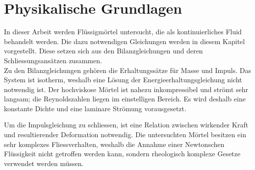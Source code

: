 \section{Physikalische Grundlagen}
\label{Kapitel:Rheologie}
In dieser Arbeit werden Flüssigmörtel untersucht, die als kontinuierliches Fluid behandelt werden.
Die dazu notwendigen Gleichungen werden in diesem Kapitel vorgestellt. Diese setzen sich aus den Bilanzgleichungen und deren Schliessungsansätzen zusammen.\\
Zu den Bilanzgleichungen gehören die Erhaltungssätze für Masse und Impuls. Das System ist isotherm, weshalb eine Lösung der Energieerhaltungsgleichung nicht notwendig ist.
Der hochviskose Mörtel ist nahezu inkompressibel und strömt sehr langsam; die Reynoldszahlen liegen im einstelligen Bereich. Es wird deshalb eine konstante Dichte und eine laminare Strömung vorausgesetzt.

Um die Impulsgleichung zu schliessen, ist eine Relation zwischen wirkender Kraft und resultierender Deformation notwendig. Die untersuchten Mörtel besitzen ein sehr komplexes Fliessverhalten, weshalb die Annahme einer Newtonschen Flüssigkeit nicht getroffen werden kann, sondern rheologisch komplexe Gesetze verwendet werden müssen.



